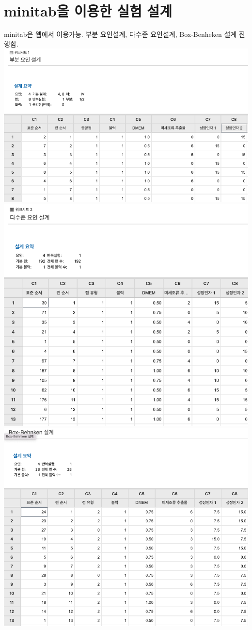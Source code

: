 \documentclass{article}
\begin{document}
    \section{minitab을 이용한 실험 설계}
    minitab은 웹에서 이용가능. 
    부분 요인설계, 다수준 요인설계, Box-Benheken 설계 진행함.
    \includegraphics[scale=0.5]{min3.png}
    \includegraphics[scale=0.5]{min2.png}
    \includegraphics[scale=0.5]{box-behnken.png}
\end{document}
